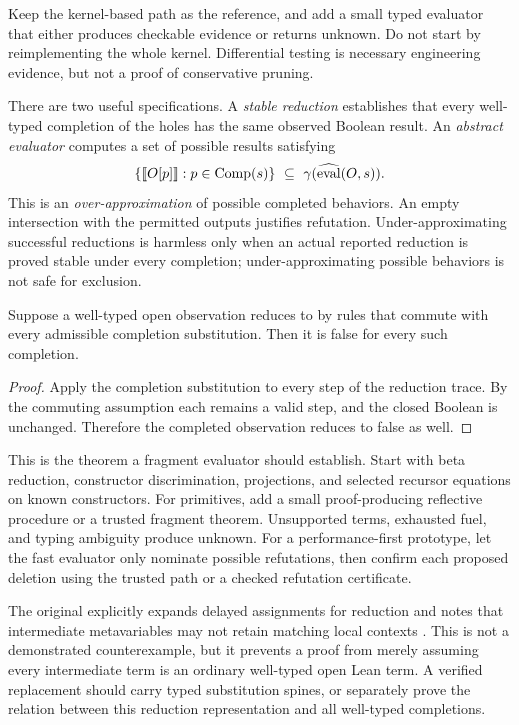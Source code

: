 \ans Keep the kernel-based path as the reference, and add a small typed evaluator that either produces checkable evidence or returns unknown. Do not start by reimplementing the whole kernel. Differential testing is necessary engineering evidence, but not a proof of conservative pruning.

There are two useful specifications. A \emph{stable reduction} establishes that every well-typed completion of the holes has the same observed Boolean result. An \emph{abstract evaluator} computes a set of possible results satisfying
\[
 \{\llbracket O[p]\rrbracket:p\in\Comp(s)\}\ \subseteq\ \gamma(\widehat{\mathrm{eval}}(O,s)).
\]
This is an \emph{over-approximation} of possible completed behaviors. An empty intersection with the permitted outputs justifies refutation. Under-approximating successful reductions is harmless only when an actual reported reduction is proved stable under every completion; under-approximating possible behaviors is not safe for exclusion.

\begin{lemma}
Suppose a well-typed open observation reduces to  by rules that commute with every admissible completion substitution. Then it is false for every such completion.
\end{lemma}
\begin{proof}
Apply the completion substitution to every step of the reduction trace. By the commuting assumption each remains a valid step, and the closed Boolean  is unchanged. Therefore the completed observation reduces to false as well.
\end{proof}

This is the theorem a fragment evaluator should establish. Start with beta reduction, constructor discrimination, projections, and selected recursor equations on known constructors. For primitives, add a small proof-producing reflective procedure or a trusted fragment theorem. Unsupported terms, exhausted fuel, and typing ambiguity produce unknown. For a performance-first prototype, let the fast evaluator only nominate possible refutations, then confirm each proposed deletion using the trusted path or a checked refutation certificate.

The original  explicitly expands delayed assignments for reduction and notes that intermediate metavariables may not retain matching local contexts \cite{searchcore}. This is not a demonstrated counterexample, but it prevents a proof from merely assuming every intermediate term is an ordinary well-typed open Lean term. A verified replacement should carry typed substitution spines, or separately prove the relation between this reduction representation and all well-typed completions.

